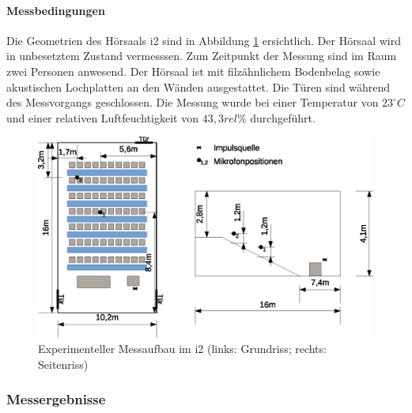 \documentclass[11pt]{report}
\begin{document}
\paragraph{Messbedingungen}
Die Geometrien des H\"orsaals i2 sind in Abbildung \ref{fig:i2geometrics} ersichtlich. Der H\"orsaal wird in unbesetztem Zustand vermesssen. Zum Zeitpunkt der Messung sind im Raum zwei Personen anwesend. Der H\"orsaal ist mit filz\"ahnlichem Bodenbelag sowie akustischen Lochplatten an den W\"anden ausgestattet. Die T\"uren sind w\"ahrend des Messvorgangs geschlossen. Die Messung wurde bei einer Temperatur von $23^\circ C$ und einer relativen Luftfeuchtigkeit von $43,3rel\%$ durchgef\"uhrt. 
\begin{figure}[htbp]
\begin{center}
\includegraphics[width=14cm,keepaspectratio=true]{i2}
\caption{Experimenteller Messaufbau im i2 (links: Grundriss; rechts: Seitenriss)}
\label{fig:i2geometrics}
\end{center}
\end{figure}
\subsubsection{Messergebnisse}
\begin{center}
\pgfplotsset{width=14cm}
\end{center}
\end{document}
